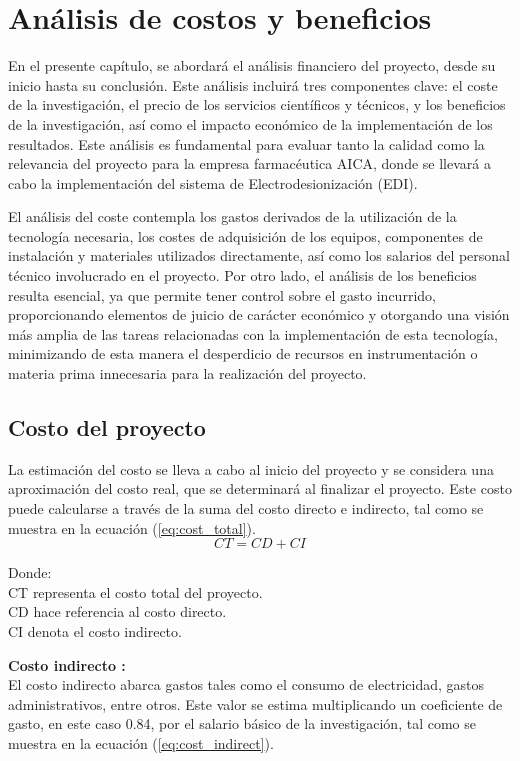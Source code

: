 \chapter{Análisis de costos y beneficios}
En el presente capítulo, se abordará el análisis financiero del proyecto, desde su inicio hasta su conclusión.
Este análisis incluirá tres componentes clave: el coste de la investigación, el precio de los servicios
científicos y técnicos, y los beneficios de la investigación, así como el impacto económico de la
implementación de los resultados. Este análisis es fundamental para evaluar tanto la calidad como la
relevancia del proyecto para la empresa farmacéutica AICA, donde se llevará a cabo la implementación
del sistema de Electrodesionización (EDI).

El análisis del coste contempla los gastos derivados de la utilización de la tecnología necesaria,
los costes de adquisición de los equipos, componentes de instalación y materiales utilizados directamente,
así como los salarios del personal técnico involucrado en el proyecto. Por otro lado, el análisis de los
beneficios resulta esencial, ya que permite tener control sobre el gasto incurrido, proporcionando elementos
de juicio de carácter económico y otorgando una visión más amplia de las tareas relacionadas con la
implementación de esta tecnología, minimizando de esta manera el desperdicio de recursos en instrumentación
o materia prima innecesaria para la realización del proyecto.


\section{Costo del proyecto}

La estimación del costo se lleva a cabo al inicio del proyecto y se considera una aproximación del costo
real, que se determinará al finalizar el proyecto. Este costo puede calcularse a través de la suma del
costo directo e indirecto, tal como se muestra en la ecuación (\ref{eq:cost_total}).
\begin{equation}
    \label{eq:cost_total}
    CT = CD + CI
\end{equation}

Donde: \\
CT representa el costo total del proyecto. \\
CD hace referencia al costo directo. \\
CI denota el costo indirecto.

\textbf{Costo indirecto :}\\
El costo indirecto abarca gastos tales como el consumo de electricidad, gastos administrativos, entre otros.
Este valor se estima multiplicando un coeficiente de gasto, en este caso 0.84, por el salario básico de la
investigación, tal como se muestra en la ecuación (\ref{eq:cost_indirect}).

